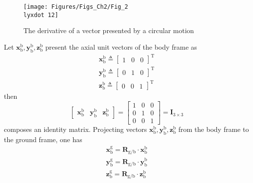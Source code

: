 \begin{figure}
	\begin{centering}
		\texttt{[image: Figures/Figs\_Ch2/Fig\_2\\lyxdot 12]}
		\par\end{centering}
	\caption{The derivative of a vector presented by a circular motion}
	
	\centering{}\label{Fig_2.12}
\end{figure}

Let $\mathbf{x}_{\text{b}}^{\text{b}},\mathbf{y}_{\text{b}}^{\text{b}},\mathbf{z}_{\text{b}}^{\text{b}}$
present the axial unit vectors of the body frame as
\begin{equation}
\begin{array}{c}
\mathbf{x}_{\text{b}}^{\text{b}}\triangleq\left[\begin{array}{ccc}
1 & 0 & 0\end{array}\right]^{\text{T}}\\
\mathbf{y}_{\text{b}}^{\text{b}}\triangleq\left[\begin{array}{ccc}
0 & 1 & 0\end{array}\right]^{\text{T}}\\
\mathbf{z}_{\text{b}}^{\text{b}}\triangleq\left[\begin{array}{ccc}
0 & 0 & 1\end{array}\right]^{\text{T}}
\end{array}
\end{equation}
then 
\[
\left[\begin{array}{ccc}
\mathbf{x}_{\text{b}}^{\text{b}} & \mathbf{y}_{\text{b}}^{\text{b}} & \mathbf{z}_{\text{b}}^{\text{b}}\end{array}\right]=\left[\begin{array}{ccc}
1 & 0 & 0\\
0 & 1 & 0\\
0 & 0 & 1
\end{array}\right]=\mathbf{I}_{3\times3}
\]
composes an identity matrix. Projecting vectors $\mathbf{x}_{\text{b}}^{\text{b}},\mathbf{y}_{\text{b}}^{\text{b}},\mathbf{z}_{\text{b}}^{\text{b}}$
from the body frame to the ground frame, one has
\begin{equation}
\begin{array}{c}
\mathbf{x}_{\text{b}}^{\text{g}}={\mathbf{R}}_{\text{{g}/{b}}}\cdot\mathbf{x}_{\text{b}}^{\text{b}}\\
\mathbf{y}_{\text{b}}^{\text{g}}={\mathbf{R}}_{\text{{g}/{b}}}\cdot\mathbf{y}_{\text{b}}^{\text{b}}\\
\mathbf{z}_{\text{b}}^{\text{g}}={\mathbf{R}}_{\text{{g}/{b}}}\cdot\mathbf{z}_{\text{b}}^{\text{b}}
\end{array}
\end{equation}
